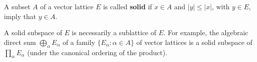 A subset $A$ of a vector lattice $E$ is called \textbf{solid} if $x \in A$ and $|y| \leq |x|$, with $y \in E$, imply that $y \in A$.

A solid subspace of $E$ is necessarily a sublattice of $E$. For example, the algebraic direct sum $\bigoplus_\alpha E_\alpha$ of a family $\{E_\alpha : \alpha \in A\}$ of vector lattices is a solid subspace of $\prod_\alpha E_\alpha$ (under the canonical ordering of the product).
